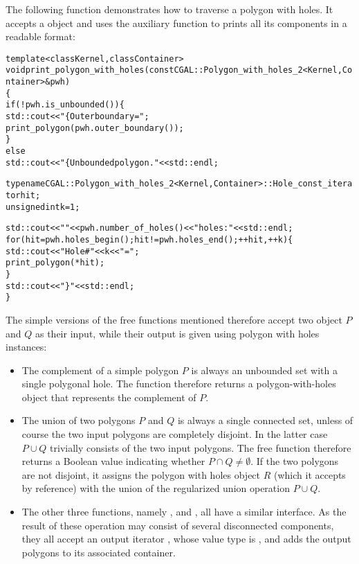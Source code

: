 The following function demonstrates how to traverse a polygon with holes.
It accepts a  object and uses the auxiliary
function  to prints all its components in a readable
format:
\begin{alltt}
template<class Kernel, class Container>
void print_polygon_with_holes(const CGAL::Polygon_with_holes_2<Kernel, Container> & pwh)
\{
  if (! pwh.is_unbounded()) \{
    std::cout << "\{ Outer boundary = "; 
    print_polygon (pwh.outer_boundary());
  \}
  else
    std::cout << "\{ Unbounded polygon." << std::endl;

  typename CGAL::Polygon_with_holes_2<Kernel,Container>::Hole_const_iterator hit;
  unsigned int k = 1;

  std::cout << "  " << pwh.number_of_holes() << " holes:" << std::endl;
  for (hit = pwh.holes_begin(); hit != pwh.holes_end(); ++hit, ++k) \{
    std::cout << "    Hole #" << k << " = ";
    print_polygon (*hit);
  \}
  std::cout << " \}" << std::endl;
\}
\end{alltt}

The simple versions of the free functions mentioned therefore
accept two  object $P$ and $Q$ as their input, while
their output is given using polygon with holes instances:
\begin{itemize}
\item The complement of a simple polygon $P$ is always an unbounded set
with a single polygonal hole. The function  therefore
returns a polygon-with-holes object that represents the complement of $P$.
\item The union of two polygons $P$ and $Q$ is always a single connected
set, unless of course the two input polygons are completely disjoint. In
the latter case $P \cup Q$ trivially consists of the two input polygons.
The free function  therefore returns a Boolean value
indicating whether $P \cap Q \neq \emptyset$. If the two polygons are not
disjoint, it assigns the polygon with holes object $R$ (which it
accepts by reference) with the union of the regularized union operation
$P \cup Q$.
\item The other three functions, namely , 
 and , all
have a similar interface. As the result of these operation may consist
of several disconnected components, they all accept an output iterator
, whose value type is , and adds the
output polygons to its associated container.
\end{itemize}

